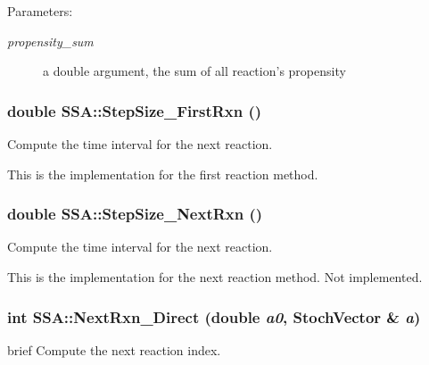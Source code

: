 \begin{Desc}
\item[Parameters:]
\begin{description}
\item[{\em propensity\_\-sum}]a double argument, the sum of all reaction's propensity \end{description}
\end{Desc}
\hypertarget{class_s_s_a_7b31f6f4b15ffce1776ae6f32474935a}{
\subsubsection{\setlength{\rightskip}{0pt plus 5cm}double SSA::StepSize\_\-FirstRxn ()}}
\label{class_s_s_a_7b31f6f4b15ffce1776ae6f32474935a}


Compute the time interval for the next reaction. 

This is the implementation for the first reaction method. \hypertarget{class_s_s_a_a379c7b468dc654e687500f4ee6894d7}{
\subsubsection{\setlength{\rightskip}{0pt plus 5cm}double SSA::StepSize\_\-NextRxn ()}}
\label{class_s_s_a_a379c7b468dc654e687500f4ee6894d7}


Compute the time interval for the next reaction. 

This is the implementation for the next reaction method. Not implemented. \hypertarget{class_s_s_a_3c77e51c6509a514a8cd513fd014d974}{
\subsubsection{\setlength{\rightskip}{0pt plus 5cm}int SSA::NextRxn\_\-Direct (double {\em a0}, \/  {\bf StochVector} \& {\em a})}}
\label{class_s_s_a_3c77e51c6509a514a8cd513fd014d974}


brief Compute the next reaction index.

